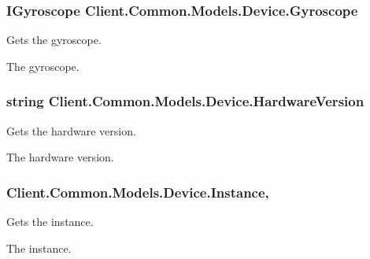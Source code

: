 \subsubsection[{Gyroscope}]{\setlength{\rightskip}{0pt plus 5cm}I\+Gyroscope Client.\+Common.\+Models.\+Device.\+Gyroscope\hspace{0.3cm}{\ttfamily [get]}}\label{classClient_1_1Common_1_1Models_1_1Device_a27b2c554bccbca57b1c4b0c474d41492}


Gets the gyroscope. 

The gyroscope.\hypertarget{classClient_1_1Common_1_1Models_1_1Device_a128b70305a8c34966c21031112172fe4}{}
\subsubsection[{Hardware\+Version}]{\setlength{\rightskip}{0pt plus 5cm}string Client.\+Common.\+Models.\+Device.\+Hardware\+Version\hspace{0.3cm}{\ttfamily [get]}}\label{classClient_1_1Common_1_1Models_1_1Device_a128b70305a8c34966c21031112172fe4}


Gets the hardware version. 

The hardware version.\hypertarget{classClient_1_1Common_1_1Models_1_1Device_a2019615475f38dea05e1afd63a87c8f9}{}
\subsubsection[{Instance}]{ Client.\+Common.\+Models.\+Device.\+Instance\hspace{0.3cm}{\ttfamily [static]}, {\ttfamily [get]}}\label{classClient_1_1Common_1_1Models_1_1Device_a2019615475f38dea05e1afd63a87c8f9}


Gets the instance. 

The instance.\hypertarget{classClient_1_1Common_1_1Models_1_1Device_ac83cd54233e05b757043739f6e82e7f4}{}
